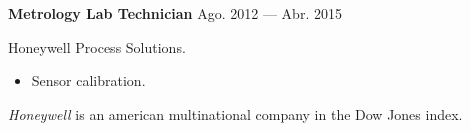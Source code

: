 \bigskip
\parbox[t][][t]{\linewidth}{
	{\parbox{\linewidth}{
		\parbox{\linewidth}{
			\textbf{Metrology Lab Technician}
			\hfill
			{Ago. 2012 --- Abr. 2015}
		}
	}}
	\smallbreak
	\parbox{\linewidth}{Honeywell Process Solutions.}
	\smallbreak
	\begin{itemize}
	    \item{Sensor calibration.}
	\end{itemize}
	\smallbreak
    \emph{Honeywell} is an american multinational company in the Dow Jones index.
}
